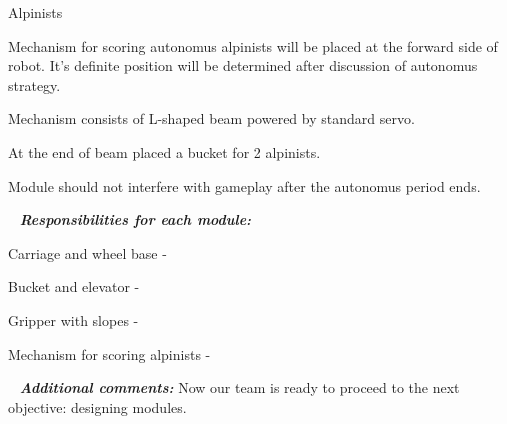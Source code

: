 \begin{enumerate*}
  	\item Alpinists
  	\begin{enumerate*}
  		\item Mechanism for scoring autonomus alpinists will be placed at the forward side of robot. It's definite position will be determined after discussion of autonomus strategy.
  		
  		\item Mechanism consists of L-shaped beam powered by standard servo.
  		
  		\item At the end of beam placed a bucket for 2 alpinists.
  		
  		\item Module should not interfere with gameplay after the autonomus period ends.
  	\end{enumerate*}
  	
  \end{enumerate*}
  
   \newline
  \textit{\textbf{Responsibilities for each module:}}
  \begin{enumerate*}
  	\item Carriage and wheel base -
  	
  	\item Bucket and elevator -
  	
  	\item Gripper with slopes -
  	
  	\item Mechanism for scoring alpinists -
  \end{enumerate*}
  
   \newline
  \textit{\textbf{Additional comments:}} Now our team is ready to proceed to the next objective: designing modules.

\fillpage
